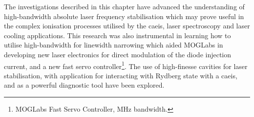 The investigations described in this chapter have advanced the understanding of high-bandwidth absolute laser frequency stabilisation which may prove useful in the complex ionisation processes utilised by the \gls{caeis}, laser spectroscopy and laser cooling applications.
This research was also instrumental in learning how to utilise high-bandwidth for linewidth narrowing which aided MOGLabs in developing new laser electronics for direct modulation of the diode injection current, and a new fast servo controller\footnote{MOGLabs Fast Servo Controller, \unit[40]{MHz} bandwidth.}.
The use of high-finesse cavities for laser stabilisation, with application for interacting with Rydberg state with a \gls{caeis}, and as a powerful diagnostic tool have been explored.
